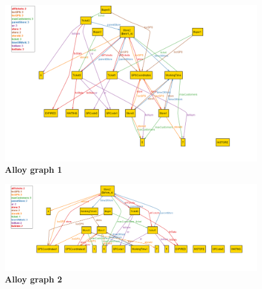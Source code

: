 \newpage

\begin{figure}
\centering
\includegraphics[width=\textwidth]{Images/AlloyGraph1}
\caption{\label{fig:alloy1}\textbf{Alloy graph 1}}
\end{figure}

\newpage

\begin{figure}
\centering
\includegraphics[width=\textwidth]{Images/AlloyGraph2}
\caption{\label{fig:alloy2}\textbf{Alloy graph 2}}
\end{figure}